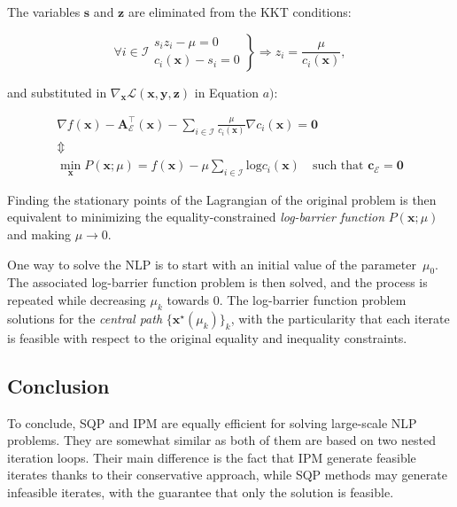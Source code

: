 The variables $\mathbf{s}$ and $\mathbf{z}$ are eliminated from the
KKT conditions:

\begin{equation}
\forall i \in \mathcal{I}
\left.\begin{array}{r}
s_iz_i - \mu = 0\\
c_i(\mathbf{x})-s_i = 0
\end{array}\right\}
\Rightarrow
z_i=\frac{\mu}{c_i(\mathbf{x})},
\end{equation}

\noindent and substituted in
$\nabla_{\mathbf{x}}\mathcal{L}(\mathbf{x},\mathbf{y},\mathbf{z})$
in Equation $a)$:

\begin{equation}
\begin{array}{c}
\nabla f(\mathbf{x}) - \mathbf{A}_{\mathcal{E}}^{\top}(\mathbf{x}) -
\sum_{i\in\mathcal{I}}\frac{\mu}{c_i(\mathbf{x})}\nabla
c_i(\mathbf{x})=\mathbf{0} \\
\Updownarrow \\
\min_{\mathbf{x}}P(\mathbf{x};\mu)=f(\mathbf{x}) -
\mu\sum_{i\in\mathcal{I}}\text{log}c_i(\mathbf{x}) \quad\text{
  such that }\mathbf{c_{\mathcal{E}}=\mathbf{0}}
\end{array}
\end{equation}

Finding the stationary points of the Lagrangian of the original
problem is then equivalent to minimizing the equality-constrained
\emph{log-barrier function} $P(\mathbf{x};\mu)$ and making $\mu
\rightarrow 0$.

One way to solve the NLP is to start with an initial value of the
parameter~$\mu_0$. The associated log-barrier function problem is then
solved, and the process is repeated while decreasing $\mu_k$ towards
0. The log-barrier function problem solutions for the \emph{central
  path} $\{\mathbf{x}^\star(\mu_k)\}_k$, with the particularity that
each iterate is feasible with respect to the original equality and
inequality constraints.

\subsection{Conclusion}

To conclude, SQP and IPM are equally efficient for solving large-scale
NLP problems. They are somewhat similar as both of them are based on
two nested iteration loops. Their main difference is the fact that IPM
generate feasible iterates thanks to their conservative approach,
while SQP methods may generate infeasible iterates, with the guarantee
that only the solution is feasible.
